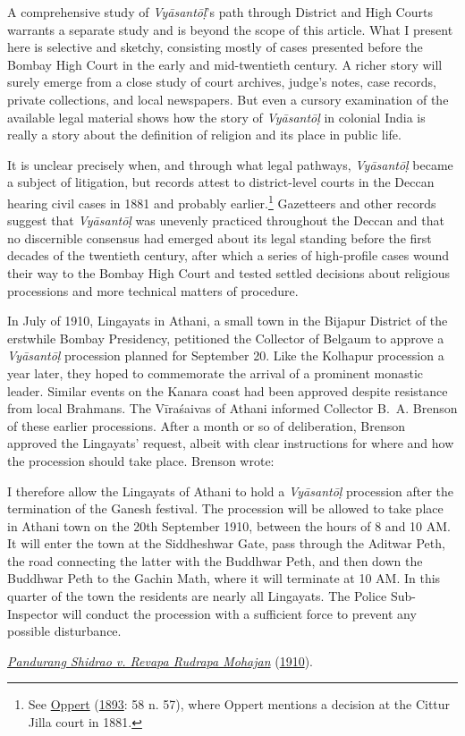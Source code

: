 A comprehensive study of \emph{Vyāsantōḷ}’s path through District and High Courts warrants a separate study and is beyond the scope of this article. What I present here is selective and sketchy, consisting mostly of cases presented before the Bombay High Court in the early and mid-twentieth century. A richer story will surely emerge from a close study of court archives, judge’s notes, case records, private collections, and local newspapers. But even a cursory examination of the available legal material shows how the story of \emph{Vyāsantōḷ} in colonial India is really a story about the definition of religion and its place in public life.


It is unclear precisely when, and through what legal pathways, \emph{Vyāsantōḷ} became a subject of litigation, but records attest to district-level courts in the Deccan hearing civil cases in 1881 and probably earlier.\footnote{%
See \hyperref[Oppert1893]{Oppert} (\hyperref[Oppert1893]{1893}: 58 n. 57), where Oppert mentions a decision at the Cittur Jilla court in 1881.
}
 Gazetteers and other records suggest that \emph{Vyāsantōḷ} was unevenly practiced throughout the Deccan and that no discernible consensus had emerged about its legal standing before the first decades of the twentieth century, after which a series of high-profile cases wound their way to the Bombay High Court and tested settled decisions about religious processions and more technical matters of procedure. 


In July of 1910, Lingayats in Athani, a small town in the Bijapur District of the erstwhile Bombay Presidency, petitioned the Collector of Belgaum to approve a \emph{Vyāsantōḷ} procession planned for September 20. Like the Kolhapur procession a year later, they hoped to commemorate the arrival of a prominent monastic leader. Similar events on the Kanara coast had been approved despite resistance from local Brahmans. The Vīraśaivas of Athani informed Collector B. A. Brenson of these earlier processions. After a month or so of deliberation, Brenson approved the Lingayats’ request, albeit with clear instructions for where and how the procession should take place. Brenson wrote: 

\begin{pullquote}
I therefore allow the Lingayats of Athani to hold a \emph{Vyāsantōḷ} procession after the termination of the Ganesh festival. The procession will be allowed to take place in Athani town on the 20th September 1910, between the hours of 8 and 10 AM. It will enter the town at the Siddheshwar Gate, pass through the Aditwar Peth, the road connecting the latter with the Buddhwar Peth, and then down the Buddhwar Peth to the Gachin Math, where it will terminate at 10 AM. In this quarter of the town the residents are nearly all Lingayats. The Police Sub-Inspector will conduct the procession with a sufficient force to prevent any possible disturbance.


\medskip\hfill\begin{minipage}{0.9\textwidth}\small\hfill
\hyperref[Pandurang]{\emph{Pandurang Shidrao v. Revapa Rudrapa Mohajan}} (\hyperref[Pandurang]{1910}).\end{minipage}\hspace{2em}
\end{pullquote}

